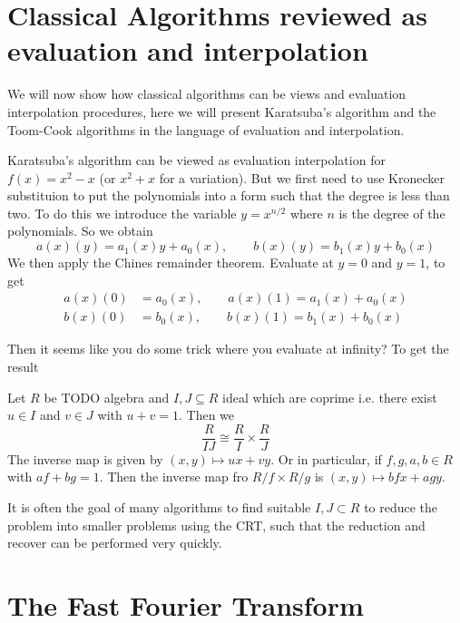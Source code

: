 \section{Classical Algorithms reviewed as evaluation and interpolation}%
\label{sec:classical_algorithms_reviewed_as_evaluation_and_interpolation}

We will now show how classical algorithms can be views and evaluation interpolation procedures, here we will present Karatsuba's algorithm and the Toom-Cook algorithms in the language of evaluation and interpolation.

Karatsuba's algorithm can be viewed as evaluation interpolation for $f(x) = x^2 - x$ (or $x^2 + x$ for a variation). But we first need to use Kronecker substituion to put the polynomials into a form such that the degree is less than two. To do this we introduce the variable $y = x^{n/2}$ where $n$ is the degree of the polynomials. So we obtain
\[
    a(x)(y) = a_1(x)y + a_0(x), \qquad b(x)(y) = b_1(x)y + b_0(x)
\]
We then apply the Chines remainder theorem. Evaluate at $y = 0$ and $y = 1$, to get
\begin{align*}
    a(x)(0) &= a_0(x), \qquad a(x)(1) = a_1(x) + a_0(x)\\
    b(x)(0) &= b_0(x), \qquad b(x)(1) = b_1(x) + b_0(x)
\end{align*}

Then it seems like you do some trick where you evaluate at infinity? To get the result

\begin{theorem}
    Let $R$ be TODO algebra and $I, J \subseteq R$ ideal which are coprime i.e. there exist $u \in I$ and $v \in J$ with $u + v = 1$. Then we 
    \[
        \frac{R}{IJ} \cong \frac{R}{I} \times \frac{R}{J}
    \]
    The inverse map is given by $(x, y) \mapsto ux + vy$. Or in particular, if $f, g, a, b \in R$ with $af + bg = 1$. Then the inverse map fro $R/f \times R/g$ is $(x, y) \mapsto bfx + agy$.
\end{theorem}

It is often the goal of many algorithms to find suitable $I, J \subset R$ to reduce the problem into smaller problems using the CRT, such that the reduction and recover can be performed very quickly.

\section{The Fast Fourier Transform}

